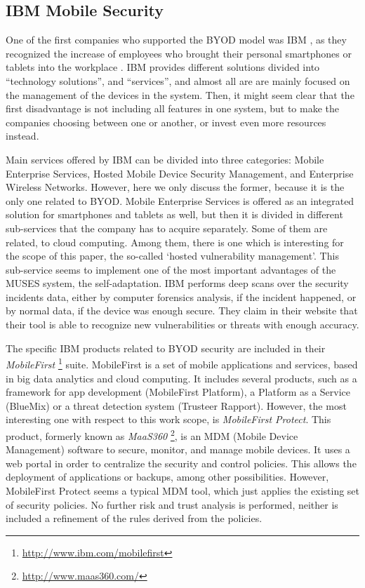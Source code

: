 
\subsection{IBM Mobile Security}
\label{subsec:ibm}

One of the first companies who supported the BYOD model was IBM \cite{IBM_tool}, as they recognized the increase of employees who brought their personal smartphones or tablets into the workplace \cite{ibm11}. IBM provides different solutions divided into ``technology solutions'', and ``services'', and almost all are are mainly focused on the management of the devices in the system. Then, it might seem clear that the first disadvantage is not including all features in one system, but to make the companies choosing between one or another, or invest even more resources instead.

Main services offered by IBM can be divided into three categories: Mobile Enterprise Services, Hosted Mobile Device Security Management, and Enterprise Wireless Networks. However, here we only discuss the former, because it is the only one related to BYOD. Mobile Enterprise Services is offered as an integrated solution for smartphones and tablets as well, but then it is divided in different sub-services that the company has to acquire separately. Some of them are related, to cloud computing. Among them, there is one which is interesting for the scope of this paper, the so-called `hosted vulnerability management'. This sub-service seems to implement one of the most important advantages of the MUSES system, the self-adaptation. IBM performs deep scans over the security incidents data, either by computer forensics analysis, if the incident happened, or by normal data, if the device was enough secure. They claim in their website \cite{ibmVulnMgm} that their tool is able to recognize new vulnerabilities or threats with enough accuracy. 

The specific IBM products related to BYOD security are included in their {\em MobileFirst} \footnote{\url{http://www.ibm.com/mobilefirst}} suite. MobileFirst is a set of mobile applications and services, based in big data analytics and cloud computing. It includes several products, such as a framework for app development (MobileFirst Platform), a Platform as a Service (BlueMix) or a threat detection system (Trusteer Rapport). However, the most interesting one with respect to this work scope, is {\em MobileFirst Protect}. This product, formerly known as {\em MaaS360} \footnote{\url{http://www.maas360.com/}}, is an MDM (Mobile Device Management) software to secure, monitor, and manage mobile devices. It uses a web portal in order to centralize the security and control policies. This allows the deployment of applications or backups, among other possibilities. However, MobileFirst Protect seems a typical MDM tool, which just applies the existing set of security policies. No further risk and trust analysis is performed, neither is included a refinement of the rules derived from the policies.

